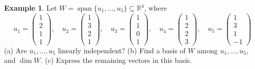 \documentclass[12pt]{article}
\newcommand{\R}{\mathbb R}
\DeclareMathOperator{\Span}{span}
\theoremstyle{definition}
\newtheorem{example}[theorem]{Example}
\begin{document}
\begin{example}\label{exm:r4-span}
Let \(W=\Span\{u_1,\dots,u_5\}\subseteq\R^4\), where
\[
u_1=\begin{pmatrix}1\\2\\1\\1\end{pmatrix},\quad
u_2=\begin{pmatrix}1\\3\\2\\1\end{pmatrix},\quad
u_3=\begin{pmatrix}1\\1\\0\\1\end{pmatrix},\quad
u_4=\begin{pmatrix}1\\2\\2\\3\end{pmatrix},\quad
u_5=\begin{pmatrix}1\\3\\1\\-1\end{pmatrix}
\]
(a) Are \(u_1,\dots,u_5\) linearly independent? (b) Find a basis of \(W\) among
\(u_1,\dots,u_5\), and \(\dim W\). (c) Express the remaining vectors in this basis.


\end{example}
\end{document}
